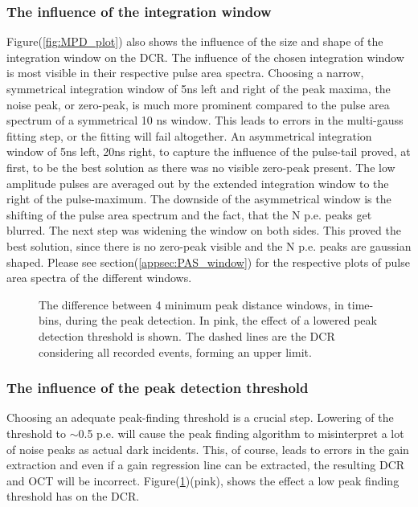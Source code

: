 \documentclass[12pt,article,type=msc,colorback,accentcolor=tud9c]{tudthesis}
\begin{document}
\subsubsection{The influence of the integration window}
Figure(\ref{fig:MPD_plot}) also shows the influence of the size and shape of the integration window on the DCR. The influence of the chosen integration window is most visible in their respective pulse area spectra. Choosing a narrow, symmetrical integration window of 5ns left and right of the peak maxima, the noise peak, or zero-peak, is much more prominent compared to the pulse area spectrum of a symmetrical 10 ns window. This leads to errors in the multi-gauss fitting step, or the fitting will fail altogether. An asymmetrical integration window of 5ns left, 20ns right, to capture the influence of the pulse-tail proved, at first, to be the best solution as there was no visible zero-peak present. The low amplitude pulses are averaged out by the extended integration window to the right of the pulse-maximum. The downside of the asymmetrical window is the shifting of the pulse area spectrum and the fact, that the N p.e. peaks get blurred. The next step was widening the window on both sides. This proved the best solution, since there is no zero-peak visible and the N p.e. peaks are gaussian shaped. Please see section(\ref{appsec:PAS_window})  for the respective plots of pulse area spectra of the different windows.
\begin{figure}[t]
\begin{centering}
\caption[MPD parameter challenges and the threshold]{The difference between 4 minimum peak distance windows, in time-bins, during the peak detection.  In pink, the effect of a lowered peak detection threshold is shown. The dashed lines are the DCR considering all recorded events, forming an upper limit.}
\label{fig:PF_Thresh_plot}
\end{centering}
\end{figure}

\subsubsection{The influence of the peak detection threshold}

Choosing an adequate peak-finding threshold is a crucial step. Lowering of the threshold to $\sim$0.5 p.e. will cause the peak finding algorithm to misinterpret a lot of noise peaks as actual dark incidents. This, of course, leads to errors in the gain extraction and even if a gain regression line can be extracted, the resulting DCR and OCT will be incorrect. Figure(\ref{fig:PF_Thresh_plot})(pink), shows the effect a low peak finding threshold has on the DCR.
\end{document}

